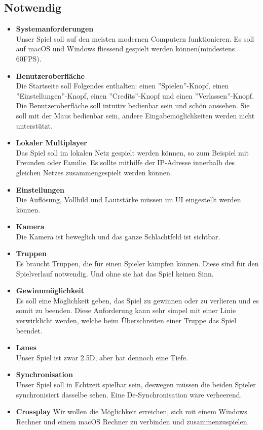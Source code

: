 \subsection{Notwendig}
\begin{itemize}
    \item \textbf{Systemanforderungen} \\
        Unser Spiel soll auf den meisten modernen Computern funktionieren. Es soll auf macOS und
        Windows fliessend gespielt werden können(mindestens 60FPS).
    \item \textbf{Benutzeroberfläche} \\
        Die Startseite soll Folgendes enthalten: einen ''Spielen''-Knopf, einen ''Einstellungen''-Knopf, einen
        ''Credits''-Knopf und einen ''Verlassen''-Knopf. Die Benutzeroberfläche soll intuitiv bedienbar sein und
        schön aussehen. Sie soll mit der Maus bedienbar sein, andere Eingabemöglichkeiten
        werden nicht unterstützt.
    \item \textbf{Lokaler Multiplayer} \\
        Das Spiel soll im lokalen Netz gespielt werden können, so zum Beispiel mit Freunden oder Familie.
        Es sollte mithilfe der IP-Adresse innerhalb des gleichen Netzes zusammengespielt werden können.
    \item \textbf{Einstellungen} \\
        Die Auflösung, Vollbild und Lautstärke müssen im UI eingestellt werden können.
    \item \textbf{Kamera} \\
        Die Kamera ist beweglich und das ganze Schlachtfeld ist sichtbar.
    \item \textbf{Truppen} \\
        Es braucht Truppen, die für einen Spieler kämpfen können. Diese sind für den Spielverlauf notwendig.
        Und ohne sie hat das Spiel keinen Sinn.
    \item \textbf{Gewinnmöglichkeit} \\
        Es soll eine Möglichkeit geben, das Spiel zu gewinnen oder zu verlieren und es somit zu beenden. Diese Anforderung kann sehr simpel
        mit einer Linie verwirklicht werden, welche beim Überschreiten einer Truppe das Spiel beendet.
    \item \textbf{Lanes} \\
        Unser Spiel ist zwar 2.5D, aber hat dennoch eine Tiefe.
    \item \textbf{Synchronisation} \\
        Unser Spiel soll in Echtzeit spielbar sein, deswegen müssen die beiden Spieler synchronisiert dasselbe sehen. Eine De-Synchronisation wäre verheerend. 
    \item \textbf{Crossplay}
        Wir wollen die Möglichkeit erreichen, sich mit einem Windows Rechner und einem macOS Rechner zu verbinden und zusammenzuspielen.
\end{itemize}

